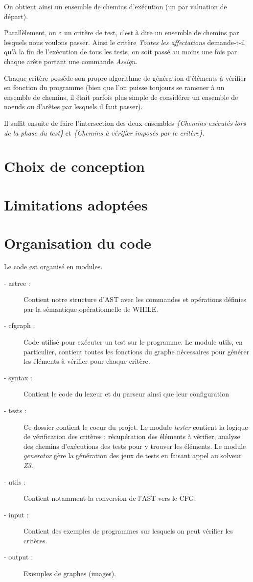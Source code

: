 \documentclass[a4paper, 12pt]{report}
\begin{document}
On obtient ainsi un ensemble de chemins d'exécution (un par valuation de départ).

Parallèlement, on a un critère de test, c'est à dire un ensemble de chemins par lesquels nous voulons passer. Ainsi le critère \textit{Toutes les affectations} demande-t-il qu'à la fin de l'exécution de tous les tests, on soit passé au moins une fois par chaque arête portant une commande \textit{Assign}.

Chaque critère possède son propre algorithme de génération d'éléments à vérifier en fonction du programme (bien que l'on puisse toujours se ramener à un ensemble de chemins, il était parfois plus simple de considérer un ensemble de noeuds ou d'arêtes par lesquels il faut passer).

Il suffit ensuite de faire l'intersection des deux ensembles \textit{\{Chemins exécutés lors de la phase du test\}} et \textit{\{Chemins à vérifier imposés par le critère\}}.


\section{Choix de conception}

\section{Limitations adoptées}

\section{Organisation du code}

Le code est organisé en modules.

\begin{description}
\item[- astree :] Contient notre structure d'AST avec les commandes et opérations définies par la sémantique opérationnelle de WHILE.
\item[- cfgraph :] Code utilisé pour exécuter un test sur le programme. Le module utils, en particulier, contient toutes les fonctions du graphe nécessaires pour générer les éléments à vérifier pour chaque critère.
\item[- syntax :] Contient le code du lexeur et du parseur ainsi que leur configuration
\item[- tests :] Ce dossier contient le coeur du projet. Le module \textit{tester} contient la logique de vérification des critères : récupération des éléments à vérifier, analyse des chemins d'exécutions des tests pour y trouver les éléments. Le module \textit{generator} gère la génération des jeux de tests en faisant appel au solveur \textit{Z3}.
\item[- utils :] Contient notamment la conversion de l'AST vers le CFG.
\item[- input :] Contient des exemples de programmes sur lesquels on peut vérifier les critères.
\item[- output :] Exemples de graphes (images). 
\end{description}
\end{document}
